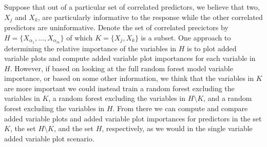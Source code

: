 \documentclass[12pt,twoside]{reedthesis}
\theoremstyle{definition}
\theoremstyle{definition}
\theoremstyle{definition}
\theoremstyle{remark}
\begin{document}
Suppose that out of a particular set of correlated predictors, we
believe that two, \(X_j\) and \(X_k\), are particularly informative to
the response while the other correlated predictors are uninformative.
Denote the set of correlated precictors by
\(H=\{X_{\alpha_1},\ldots,X_{\alpha_m}\}\) of which \(K=\{X_j,X_k\}\) is
a subset. One approach to determining the relative importance of the
variables in \(H\) is to plot added variable plots and compute added
variable plot importances for each variable in \(H\). However, if based
on looking at the full random forest model variable importance, or based
on some other information, we think that the variables in \(K\) are more
important we could instead train a random forest excluding the variables
in \(K\), a random forest excluding the variables in \(H\setminus K\),
and a random forest excluding the variables in \(H\). From there we can
compute and compare added variable plots and added variable plot
importances for predictors in the set \(K\), the set \(H\setminus K\),
and the set \(H\), respectively, as we would in the single variable
added variable plot scenario. \par
\end{document}
